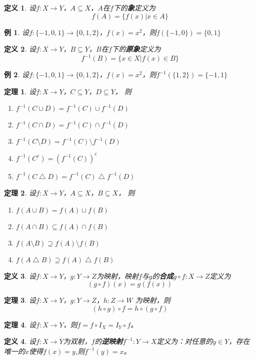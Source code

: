 \documentclass{book}[oneside]
\newtheorem{Def}{定义}[chapter]
\newtheorem{Thm}{定理}[chapter]
\newtheorem*{Example}{例}
\begin{document}
\begin{CJK*}{UTF8}{gbsn}
  
  \begin{Def}
    设$f:X\to Y$，$A \subseteq X$，$A$在$f$下的{\bfseries 象}定义为\[f(A)=\{f(x)|x\in A\}\]
  \end{Def}
  \begin{Example}
    设$f:\{-1,0,1\}\to \{0,1,2\}$，$f(x)=x^2$，则$f(\{-1,0\})=\{0,1\}$
  \end{Example}
  \begin{Def}
    设$f:X\to Y$，$B \subseteq Y$，$B$在$f$下的{\bfseries 原象}定义为\[f^{-1}(B)=\{x\in X|f(x)\in B\}\]
  \end{Def}
  \begin{Example}
    设$f:\{-1,0,1\}\to \{0,1,2\}$，$f(x)=x^2$，则$f^{-1}(\{1,2\})=\{-1,1\}$
  \end{Example}
  \begin{Thm}
    设$f:X\to Y$，$C \subseteq Y$，$D \subseteq Y$， 则
    \begin{enumerate}
    \item $f^{-1}(C \cup D) = f^{-1}(C) \cup f^{-1}(D)$
    \item $f^{-1}(C \cap D) = f^{-1}(C) \cap f^{-1}(D)$
    \item $f^{-1}(C \setminus D)=f^{-1}(C) \setminus f^{-1}(D)$
    \item $f^{-1}(C^c) = (f^{-1}(C))^c$
    \item $f^{-1}(C \bigtriangleup D) = f^{-1}(C) \bigtriangleup f^{-1}(D)$
    \end{enumerate}
  \end{Thm}
    \begin{Thm}
    设$f:X\to Y$，$A \subseteq X$，$B \subseteq X$， 则
    \begin{enumerate}
    \item $f(A \cup B) = f(A) \cup f(B)$
    \item $f(A \cap B) \subseteq f(A) \cap f(B)$
    \item $f(A \setminus B) \supseteq f(A) \setminus f(B)$
    \item $f(A \bigtriangleup B) \supseteq f(A) \bigtriangleup f(B)$
    \end{enumerate}
  \end{Thm}

  \begin{Def}
    设$f:X\to Y$，$g:Y\to Z$为映射，映射$f$与$g$的{\bfseries 合成}$g\circ f:X\to Z$定义为\[(g\circ f)(x) = g(f(x))\]
  \end{Def}
\begin{Thm}
  设$f:X \to Y$，$g:Y\to Z$，$h:Z\to W$ 为映射，则 \[ (h \circ g) \circ f = h \circ (g \circ f) \]
\end{Thm}
\begin{Thm}
  设$f:X \to Y$，则$f = f\circ I_X = I_Y \circ f$。
\end{Thm}
  \begin{Def}
     设$f:X\to Y$为双射，$f$的{\bfseries 逆映射}$f^{-1}:Y\to X$定义为：对任意的$y\in Y$，存在唯一的$x$使得$f(x)=y$,则$f^{-1}(y)=x$。
   \end{Def}


\end{CJK*}
\end{document}
